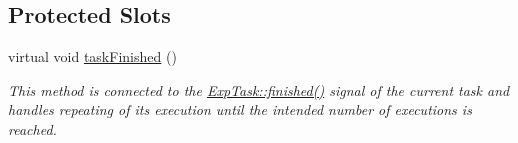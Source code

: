 \subsection*{Protected Slots}
\begin{DoxyCompactItemize}
\item 
virtual void \hyperlink{class_exp_task_list_afba27c0ec9da9a87cea6a15fc5a2beca}{task\+Finished} ()
\begin{DoxyCompactList}\small\item\em This method is connected to the \hyperlink{class_exp_task_aeb51d072a7b96f55da3738a8c7733611}{Exp\+Task\+::finished()} signal of the current task and handles repeating of its execution until the intended number of executions is reached. \end{DoxyCompactList}\end{DoxyCompactItemize}
